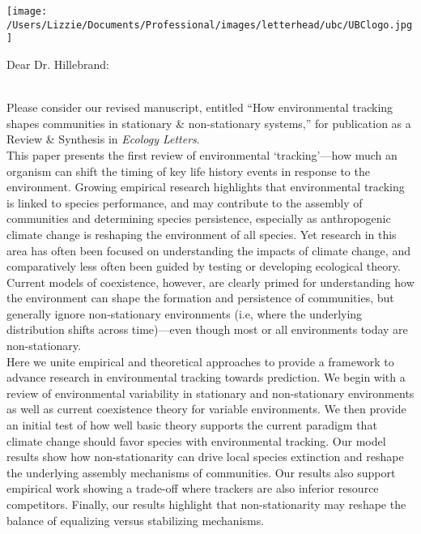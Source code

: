 \documentclass[12pt,a4paper]{letter}
\begin{document}
\begin{letter}{}
\texttt{[image: /Users/Lizzie/Documents/Professional/images/letterhead/ubc/UBClogo.jpg]}
\opening{Dear Dr. Hillebrand:}
\vspace{1.5ex}\\
Please consider our revised manuscript, entitled ``How environmental tracking shapes communities in stationary \& non-stationary systems,'' for publication as a Review \& Synthesis in \emph{Ecology Letters}. 
\vspace{1.5ex}\\
This paper presents the first review of environmental `tracking'---how much an organism can shift the timing of key life history events in response to the environment. Growing empirical research highlights that environmental tracking is linked to species performance, and may contribute to the assembly of communities and determining species persistence, especially as anthropogenic climate change is reshaping the environment of all species. Yet research in this area has often been focused on understanding the impacts of climate change, and comparatively less often been guided by testing or developing ecological theory. Current models of coexistence, however, are clearly primed for understanding how the environment can shape the formation and persistence of communities, but generally ignore non-stationary environments (i.e, where the underlying distribution shifts across time)---even though most or all environments today are non-stationary. 
\vspace{1.5ex}\\
Here we unite empirical and theoretical approaches to provide a framework to advance research in environmental tracking towards prediction. We begin with a review of environmental variability in stationary and non-stationary environments as well as current coexistence theory for variable environments. We then provide an initial test of how well basic theory supports the current paradigm that climate change should favor species with environmental tracking. Our model results show how non-stationarity can drive local species extinction and reshape the underlying assembly mechanisms of communities. Our results also support empirical work showing a trade-off where trackers are also inferior resource competitors. Finally, our results highlight that non-stationarity may reshape the balance of equalizing versus stabilizing mechanisms. 
\vspace{1.5ex}\\

\end{letter}
\end{document}
